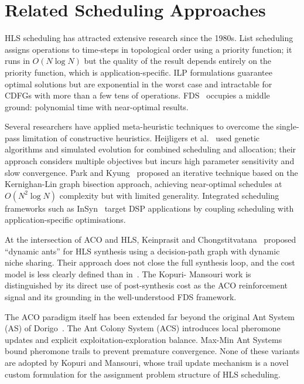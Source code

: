 \documentclass[conference]{IEEEtran}
\begin{document}
\section{Related Scheduling Approaches}

HLS scheduling has attracted extensive research since the 1980s. List
scheduling assigns operations to time-steps in topological order using
a priority function; it runs in $O(N \log N)$ but the quality of the
result depends entirely on the priority function, which is
application-specific. ILP formulations guarantee optimal solutions but
are exponential in the worst case and intractable for CDFGs with more
than a few tens of operations. FDS~\cite{paulin1987fds} occupies a
middle ground: polynomial time with near-optimal results.

Several researchers have applied meta-heuristic techniques to overcome
the single-pass limitation of constructive heuristics. Heijligers
et al.~\cite{heijligers1995} used genetic algorithms and simulated
evolution for combined scheduling and allocation; their approach
considers multiple objectives but incurs high parameter sensitivity
and slow convergence. Park and Kyung~\cite{park1991} proposed an
iterative technique based on the Kernighan-Lin graph bisection approach,
achieving near-optimal schedules at $O(N^{2}\log N)$ complexity but
with limited generality. Integrated scheduling frameworks such as
InSyn~\cite{sharma1994} target DSP applications by coupling scheduling
with application-specific optimisations.

At the intersection of ACO and HLS, Keinprasit and
Chongstitvatana~\cite{keinprasit2003} proposed ``dynamic ants'' for
HLS synthesis using a decision-path graph with dynamic niche sharing.
Their approach does not close the full synthesis loop, and the cost
model is less clearly defined than in~\cite{kopuri2004aco}. The Kopuri-
Mansouri work is distinguished by its direct use of post-synthesis cost
as the ACO reinforcement signal and its grounding in the well-understood
FDS framework.

The ACO paradigm itself has been extended far beyond the original Ant
System (AS) of Dorigo~\cite{dorigo1992}. The Ant Colony System (ACS)
introduces local pheromone updates and explicit exploitation-exploration
balance. Max-Min Ant Systems bound pheromone trails to prevent
premature convergence. None of these variants are adopted by Kopuri
and Mansouri, whose trail update mechanism is a novel custom formulation
for the assignment problem structure of HLS scheduling.
\end{document}
